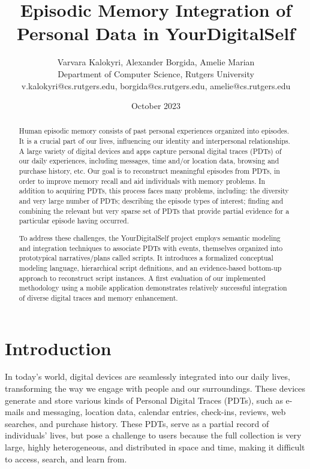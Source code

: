 \documentclass[11pt]{article}
\begin{document}
\title{Episodic Memory Integration of Personal Data in YourDigitalSelf}
\author{Varvara Kalokyri, Alexander Borgida, Amelie Marian\\
 Department of Computer Science, Rutgers University\\
v.kalokyri@cs.rutgers.edu, borgida@cs.rutgers.edu, amelie@cs.rutgers.edu}
\date{October 2023}

\maketitle

\begin{abstract}
Human episodic memory consists of past personal
experiences organized into episodes. It is a crucial
part of our lives, influencing our identity and interpersonal
relationships. A large variety of digital devices and apps capture personal digital traces (PDTs) of our daily experiences,  including
messages, time and/or location data, browsing and purchase history, etc. Our goal
is to reconstruct meaningful episodes from PDTs, in order to 
improve memory recall and aid individuals with memory problems. In addition to acquiring PDTs, this process faces many problems, including: 
the diversity and very large number of PDTs;
describing the episode types of interest; 
finding and  combining the relevant but very sparse set of PDTs that provide
partial evidence for a particular episode having occurred.


To address these challenges, the YourDigitalSelf project employs semantic modeling and integration techniques to associate  PDTs with events, themselves organized into prototypical narratives/plans called scripts. It introduces a formalized conceptual modeling language, hierarchical script definitions, and an evidence-based bottom-up approach to reconstruct script instances. A first evaluation of our implemented methodology using a mobile application demonstrates relatively successful integration of diverse digital traces and memory enhancement.  
 
\end{abstract}

\section{Introduction}
In today's world, digital devices are seamlessly integrated into our daily lives, transforming the way we engage with people and our surroundings. These devices generate and store various kinds of Personal Digital Traces (PDTs), such as e-mails and messaging, location data, calendar entries, check-ins, reviews, web searches, and purchase history.  These PDTs, serve as a partial record of individuals' lives, but  pose a challenge to users because the full collection is very large, highly heterogeneous, and distributed in space and time, making it difficult to access, search, and learn from.
\end{document}
